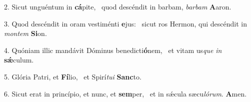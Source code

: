 2. Sicut unguéntum in \textbf{cá}pite, \ast\  quod descéndit in barbam, \textit{bar}\textit{bam} \textbf{A}aron.\

3. Quod descéndit in oram vestiménti \textbf{e}jus: \ast\  sicut ros Hermon, qui descéndit in \textit{mon}\textit{tem} \textbf{Si}on.\

4. Quóniam illic mandávit Dóminus benedicti\textbf{ó}nem, \ast\  et vitam us\textit{que} \textit{in} \textbf{sǽ}culum.\

5. Glória Patri, et \textbf{Fí}lio, \ast\  et Spirí\textit{tu}\textit{i} \textbf{Sanc}to.\

6. Sicut erat in princípio, et nunc, et \textbf{sem}per, \ast\  et in sǽcula sæcu\textit{ló}\textit{rum}. \textbf{A}men.\

